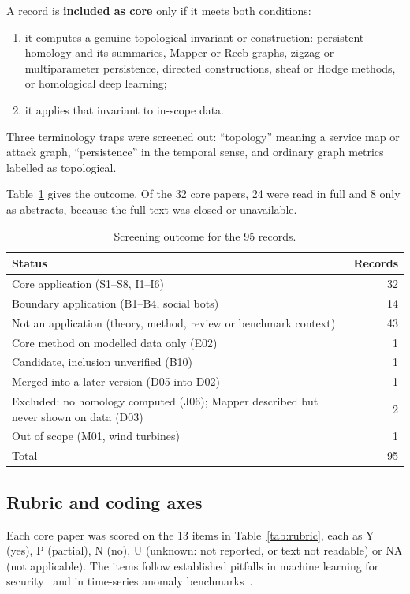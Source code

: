 A record is \textbf{included as core} only if it meets both conditions:
\begin{enumerate}
  \item it computes a genuine topological invariant or construction: persistent homology and its summaries, Mapper or Reeb graphs, zigzag or multiparameter persistence, directed constructions, sheaf or Hodge methods, or homological deep learning;
  \item it applies that invariant to in-scope data.
\end{enumerate}

Three terminology traps were screened out: ``topology'' meaning a service map or attack graph, ``persistence'' in the temporal sense, and ordinary graph metrics labelled as topological.

Table~\ref{tab:screening} gives the outcome. Of the 32 core papers, 24 were read in full and 8 only as abstracts, because the full text was closed or unavailable.

\begin{table}[ht]
\centering\small
\caption{Screening outcome for the 95 records.}
\label{tab:screening}
\begin{tabular}{@{}lr@{}}
\toprule
Status & Records \\
\midrule
Core application (S1--S8, I1--I6) & 32 \\
Boundary application (B1--B4, social bots) & 14 \\
Not an application (theory, method, review or benchmark context) & 43 \\
Core method on modelled data only (E02) & 1 \\
Candidate, inclusion unverified (B10) & 1 \\
Merged into a later version (D05 into D02) & 1 \\
Excluded: no homology computed (J06); Mapper described but never shown on data (D03) & 2 \\
Out of scope (M01, wind turbines) & 1 \\
\midrule
Total & 95 \\
\bottomrule
\end{tabular}
\end{table}

\subsection{Rubric and coding axes}
\label{sec:rubric}
Each core paper was scored on the 13 items in Table~\ref{tab:rubric}, each as Y (yes), P (partial), N (no), U (unknown: not reported, or text not readable) or NA (not applicable). The items follow established pitfalls in machine learning for security~\cite{sommer2010closed,arp2022dos} and in time-series anomaly benchmarks~\cite{Q04,kim2022rigorous}.

